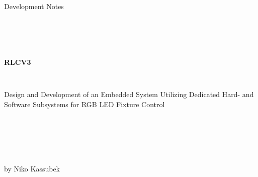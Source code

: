 \thispagestyle{empty}
\begin{verbatim}


\end{verbatim}

\begin{center}
\large{Development Notes }

\end{center}

\begin{verbatim}



\end{verbatim}
\begin{center}
	\makebox[\linewidth]{\rule{\linewidth}{0.4pt}}
\end{center}
\begin{verbatim}
	
\end{verbatim}
\begin{center}
	\textbf{\huge RLCV3} 
\end{center}
\begin{verbatim}
	
\end{verbatim}

\begin{center}
	\large Design and Development of an Embedded System Utilizing Dedicated Hard- and Software Subsystems for RGB LED Fixture Control
\end{center}
\begin{verbatim}
	
\end{verbatim}
\begin{center}
	\makebox[\linewidth]{\rule{\linewidth}{0.4pt}}
\end{center}

\begin{verbatim}
	
	
	
\end{verbatim}

\begin{center}
	by Niko Kassubek
\end{center}
